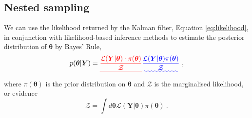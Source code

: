 \documentclass[fleqn,usenatbib,useAMS]{mnras}
\providecommand{\DIFadd}[1]{{\protect\color{blue}\uwave{#1}}} %
\providecommand{\DIFdel}[1]{{\protect\color{red}\sout{#1}}}                      %
\providecommand{\DIFaddbegin}{} %
\providecommand{\DIFaddend}{} %
\providecommand{\DIFdelbegin}{} %
\providecommand{\DIFdelend}{} %
\newcommand{\DIFscaledelfig}{0.5}
\newlength{\DIFdelgraphicswidth} %
\newlength{\DIFdelgraphicsheight} %
\newcommand{\DIFaddincludegraphics}[2][]{{\color{blue}\fbox{\DIFOincludegraphics[#1]{#2}}}} %
\newcommand{\DIFdelincludegraphics}[2][]{%
\sbox{\DIFdelgraphicsbox}{\DIFOincludegraphics[#1]{#2}}%
\settoboxwidth{\DIFdelgraphicswidth}{\DIFdelgraphicsbox} %
\settoboxtotalheight{\DIFdelgraphicsheight}{\DIFdelgraphicsbox} %
\scalebox{\DIFscaledelfig}{%
\parbox[b]{\DIFdelgraphicswidth}{\usebox{\DIFdelgraphicsbox}\\[-\baselineskip] \rule{\DIFdelgraphicswidth}{0em}}\llap{\resizebox{\DIFdelgraphicswidth}{\DIFdelgraphicsheight}{%
\setlength{\unitlength}{\DIFdelgraphicswidth}%
\begin{picture}(1,1)%
\thicklines\linethickness{2pt} %
{\color[rgb]{1,0,0}\put(0,0){\framebox(1,1){}}}%
{\color[rgb]{1,0,0}\put(0,0){\line( 1,1){1}}}%
{\color[rgb]{1,0,0}\put(0,1){\line(1,-1){1}}}%
\end{picture}%
}\hspace*{3pt}}} %
} %
\DeclareRobustCommand{\DIFaddbegin}{\DIFOaddbegin \let\includegraphics\DIFaddincludegraphics} %
\DeclareRobustCommand{\DIFaddend}{\DIFOaddend \let\includegraphics\DIFOincludegraphics} %
\DeclareRobustCommand{\DIFdelbegin}{\DIFOdelbegin \let\includegraphics\DIFdelincludegraphics} %
\DeclareRobustCommand{\DIFdelend}{\DIFOaddend \let\includegraphics\DIFOincludegraphics} %
\begin{document}


\subsection{Nested sampling}\label{sec:nested_sampling}
We can use the likelihood returned by the Kalman filter, Equation \eqref{eq:likelihood}, in conjunction with likelihood-based inference methods to estimate the posterior distribution of $\boldsymbol{\theta}$ by Bayes' Rule,
\begin{equation}
	p(\boldsymbol{\theta} | \boldsymbol{Y}) = \DIFdelbegin \DIFdel{\frac{\mathcal{L}(\boldsymbol{Y} | \boldsymbol{\theta}) \cdot \pi(\boldsymbol{\theta})}{\mathcal{Z}} }\DIFdelend \DIFaddbegin \DIFadd{\frac{\mathcal{L}(\boldsymbol{Y} | \boldsymbol{\theta}) \pi(\boldsymbol{\theta})}{\mathcal{Z}} }\DIFaddend \ ,
\end{equation}
where $\pi(\boldsymbol{\theta})$ is the prior distribution on $\boldsymbol{\theta}$ and $\mathcal{Z}$ is the marginalised likelihood, or evidence
\begin{equation}
	\mathcal{Z} = \int d \boldsymbol{\theta} \mathcal{L}(\boldsymbol{Y} | \boldsymbol{\theta})  \pi(\boldsymbol{\theta})  \ . \label{eq:model_evidence}
\end{equation}
\end{document}
